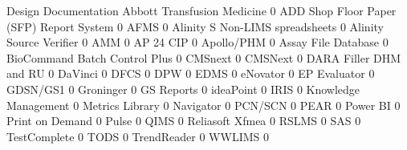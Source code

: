 \documentclass{article}
\begin{document}
\begin{Schunk}
\begin{Soutput}
                                           Design Documentation
  Abbott Transfusion Medicine                                 0
  ADD Shop Floor Paper (SFP) Report System                    0
  AFMS                                                        0
  Alinity S Non-LIMS spreadsheets                             0
  Alinity Source Verifier                                     0
  AMM                                                         0
  AP 24 CIP                                                   0
  Apollo/PHM                                                  0
  Assay File Database                                         0
  BioCommand Batch Control Plus                               0
  CMSnext                                                     0
  CMSNext                                                     0
  DARA Filler DHM and RU                                      0
  DaVinci                                                     0
  DFCS                                                        0
  DPW                                                         0
  EDMS                                                        0
  eNovator                                                    0
  EP Evaluator                                                0
  GDSN/GS1                                                    0
  Groninger                                                   0
  GS Reports                                                  0
  ideaPoint                                                   0
  IRIS                                                        0
  Knowledge Management                                        0
  Metrics Library                                             0
  Navigator                                                   0
  PCN/SCN                                                     0
  PEAR                                                        0
  Power BI                                                    0
  Print on Demand                                             0
  Pulse                                                       0
  QIMS                                                        0
  Reliasoft Xfmea                                             0
  RSLMS                                                       0
  SAS                                                         0
  TestComplete                                                0
  TODS                                                        0
  TrendReader                                                 0
  WWLIMS                                                      0
                                          

\end{Soutput}
\end{Schunk}
\end{document}

